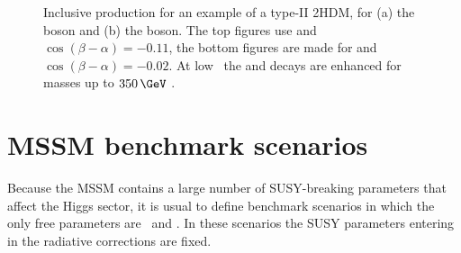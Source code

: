 \begin{figure}[h!]
\begin{center}
\end{center}
\caption[Inclusive production \xsbr for an example of a type-II 2HDM, for the \PHiggs and \PHiggsps bosons.]{Inclusive production \xsbr for an example
of a type-II \ac{2HDM}, for (a) the \PHiggs boson and (b) the \PHiggsps boson. The
top figures use  and $\cos{(\beta-\alpha)}=-0.11$, the bottom
figures are made for  and $\cos{(\beta-\alpha)}=-0.02$. At low \tanb~the \Htohh and
\AtoZh decays are enhanced for masses up to $350\,\GeV$ \cite{2HDM-II}.}
\label{fig:2hdm_Hxsbr}
\end{figure}


\section{MSSM benchmark scenarios}
\label{sec:theory_BSM_models}
Because the MSSM contains a large number of
SUSY-breaking parameters that affect the Higgs
sector, it is usual to define benchmark scenarios 
in which the only free parameters are \mA~and \tanb.
In these scenarios the SUSY parameters entering in 
the radiative corrections are fixed.

